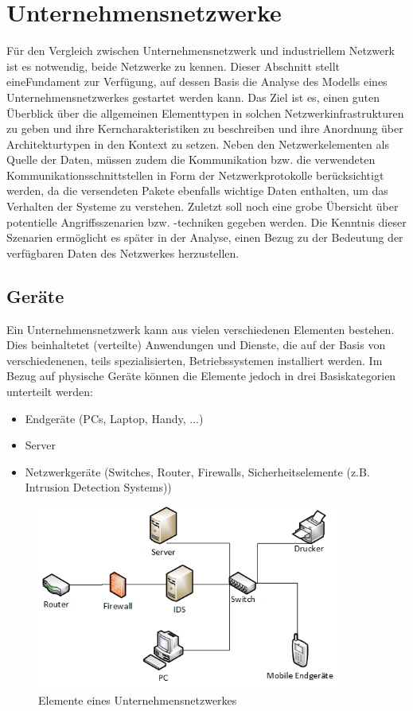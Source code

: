 \section{Unternehmensnetzwerke}
Für den Vergleich zwischen Unternehmensnetzwerk und industriellem Netzwerk ist es notwendig, beide Netzwerke zu kennen. Dieser Abschnitt stellt eineFundament zur Verfügung, auf dessen Basis die Analyse des Modells eines Unternehmensnetzwerkes gestartet werden kann. Das Ziel ist es, einen guten Überblick über die allgemeinen Elementtypen in solchen Netzwerkinfrastrukturen zu geben und ihre Kerncharakteristiken zu beschreiben und ihre Anordnung über Architekturtypen in den Kontext zu setzen. 
Neben den Netzwerkelementen als Quelle der Daten, müssen zudem die Kommunikation bzw. die verwendeten Kommunikationsschnittstellen in Form der Netzwerkprotokolle berücksichtigt werden, da die versendeten Pakete ebenfalls wichtige Daten enthalten, um das Verhalten der Systeme zu verstehen. Zuletzt soll noch eine grobe Übersicht über potentielle Angriffsszenarien bzw. -techniken gegeben werden. Die Kenntnis dieser Szenarien ermöglicht es später in der Analyse, einen Bezug zu der Bedeutung der verfügbaren Daten des Netzwerkes herzustellen.

\subsection{Geräte}
Ein Unternehmensnetzwerk kann aus vielen verschiedenen Elementen bestehen. Dies beinhaltetet (verteilte) Anwendungen und Dienste, die auf der Basis von verschiedenenen, teils spezialisierten, Betriebssystemen installiert werden. Im Bezug auf physische Geräte können die Elemente jedoch in drei Basiskategorien unterteilt werden:
\begin{itemize}
\item Endgeräte (PCs, Laptop, Handy, ...)
\item Server
\item Netzwerkgeräte (Switches, Router, Firewalls, Sicherheitselemente (z.B. Intrusion Detection Systems))
\end{itemize}

\begin{figure}[h]
\centering
\includegraphics[width=100mm]{Zeichnungen/EnterpriseGeraete.png}
\caption{Elemente eines Unternehmensnetzwerkes}
\label{fig:EnterpriseGeraete}
\end{figure}

